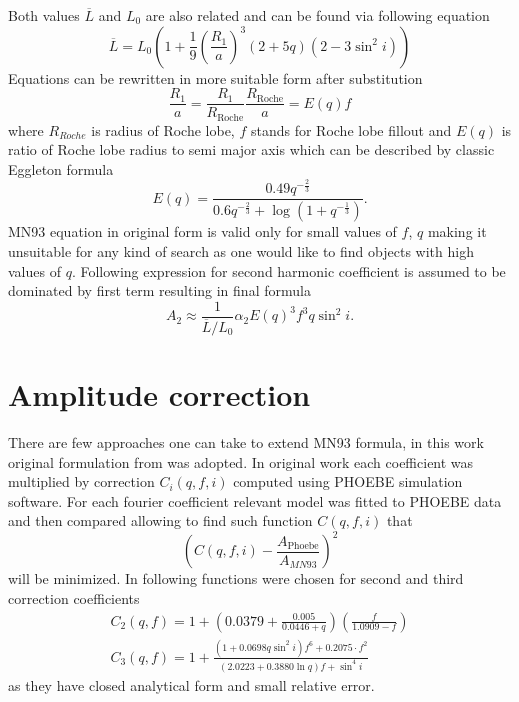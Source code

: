 \documentclass{pracalicmgr}
\begin{document}
Both values $\overline{L}$ and $L_0$ are also related and can be found via following equation
\begin{equation}
    \overline{L}=L_0\left(1+\frac{1}{9}\left(\frac{R_1}{a}\right)^3(2+5q)(2-3\sin^2{i})\right)
\end{equation}
Equations can be rewritten in more suitable form after substitution
$$\frac{R_1}{a}=\frac{R_1}{R_{\textrm{Roche}}}\frac{R_{\textrm{Roche}}}{a}=E(q)f$$ 
where $R_{Roche}$ 
is radius of Roche lobe, $f$ stands for Roche lobe fillout and $E(q)$ is ratio of Roche lobe radius to semi major axis which can be described by classic Eggleton formula 
\citep{eggleton_approximations_1983}
\begin{equation}
    E(q)=\frac{0.49q^{-\frac{2}{3}}}{0.6q^{-\frac{2}{3}}+\log{(1+q^{-\frac{1}{3}})}}.
\end{equation}
MN93 equation in original form is valid only for small values of $f$, $q$ making it unsuitable for any kind of search as one would like to find objects with high values of $q$.
Following \citet{gomel_search_2021-1} expression for second harmonic coefficient is assumed to be dominated by first term resulting in final formula 
\begin{equation}
    A_2\approx \frac{1}{\overline{L}/L_0} \alpha_2 E(q)^3 f^3 q \sin^2{i}.
\end{equation}
\section{Amplitude correction}
There are few approaches one can take to extend MN93 formula, in this work original formulation from \citep{gomel_search_2021} was adopted.
In original work each coefficient was multiplied by correction $C_i(q,f,i)$ computed using PHOEBE simulation software. For each
fourier coefficient relevant model was fitted to PHOEBE data and then compared allowing to find such function $C(q,f,i)$ that 
\begin{equation}
    \left(C(q,f,i)-\frac{A_{\textrm{Phoebe}}}{A_{MN93}}\right)^2
\end{equation}
will be minimized. In \cite{gomel_search_2021} following functions were chosen for second and third correction coefficients
\begin{align}
    C_2(q,f)=1+\left(0.0379+\frac{0.005}{0.0446+q}\right)\left(\frac{f}{1.0909-f}\right)\\
    C_3(q,f)=1+\frac{(1+0.0698q\sin^2{i})f^6+0.2075\cdot f^2}{(2.0223+0.3880\ln{q})f+\sin^4{i}}
\end{align}
as they have closed analytical form and small relative error. 
\end{document}
